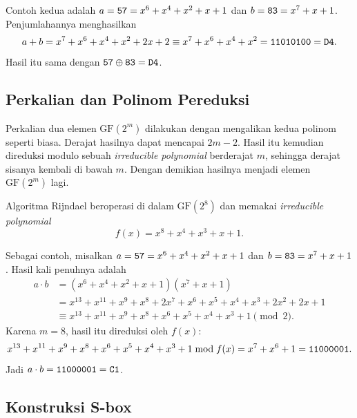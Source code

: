 Contoh kedua adalah $a = \texttt{57} = x^6 + x^4 + x^2 + x + 1$ dan
$b = \texttt{83} = x^7 + x + 1$. Penjumlahannya menghasilkan
\[
a + b = x^7 + x^6 + x^4 + x^2 + 2x + 2
\equiv x^7 + x^6 + x^4 + x^2 = \texttt{11010100} = \texttt{D4}.
\]
Hasil itu sama dengan $\texttt{57} \oplus \texttt{83} = \texttt{D4}$.

\subsection{Perkalian dan Polinom Pereduksi}

Perkalian dua elemen $\text{GF}(2^m)$ dilakukan dengan mengalikan kedua polinom
seperti biasa. Derajat hasilnya dapat mencapai $2m-2$. Hasil itu kemudian
direduksi modulo sebuah \textit{irreducible polynomial} berderajat $m$, sehingga
derajat sisanya kembali di bawah $m$. Dengan demikian hasilnya menjadi elemen
$\text{GF}(2^m)$ lagi.

Algoritma Rijndael beroperasi di dalam $\text{GF}(2^8)$ dan memakai
\textit{irreducible polynomial}
\[
f(x) = x^8 + x^4 + x^3 + x + 1.
\]

Sebagai contoh, misalkan $a = \texttt{57} = x^6 + x^4 + x^2 + x + 1$ dan
$b = \texttt{83} = x^7 + x + 1$. Hasil kali penuhnya adalah
\[
\begin{aligned}
a \cdot b
&= (x^6 + x^4 + x^2 + x + 1)(x^7 + x + 1) \\
&= x^{13} + x^{11} + x^9 + x^8 + 2x^7 + x^6 + x^5 + x^4 + x^3
+ 2x^2 + 2x + 1 \\
&\equiv x^{13} + x^{11} + x^9 + x^8 + x^6 + x^5 + x^4 + x^3 + 1
\pmod 2.
\end{aligned}
\]
Karena $m = 8$, hasil itu direduksi oleh $f(x)$:
\[
x^{13} + x^{11} + x^9 + x^8 + x^6 + x^5 + x^4 + x^3 + 1 \bmod f(x)
= x^7 + x^6 + 1 = \texttt{11000001}.
\]
Jadi $a \cdot b = \texttt{11000001} = \texttt{C1}$.

\subsection{Konstruksi S-box}

